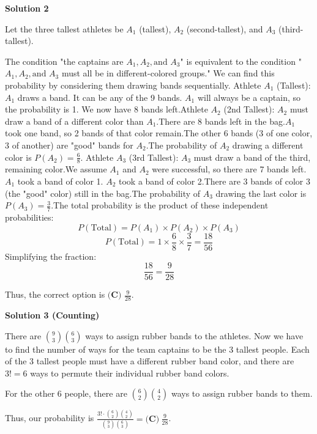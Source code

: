 \begin{enumerate}
\textbf{Solution 2}

Let the three tallest athletes be $A_1$ (tallest), $A_2$ (second-tallest), and $A_3$ (third-tallest).

 The condition "the captains are $A_1, A_2, \text{and } A_3$" is equivalent to the condition "$A_1, A_2, \text{and } A_3$ must all be in different-colored groups." We can find this probability by considering them drawing bands sequentially. Athlete $A_1$ (Tallest): $A_1$ draws a band. It can be any of the 9 bands. $A_1$ will always be a captain, so the probability is 1. We now have 8 bands left.Athlete $A_2$ (2nd Tallest): $A_2$ must draw a band of a different color than $A_1$.There are 8 bands left in the bag.$A_1$ took one band, so 2 bands of that color remain.The other 6 bands (3 of one color, 3 of another) are "good" bands for $A_2$.The probability of $A_2$ drawing a different color is $P(A_2) = \frac{6}{8}$. Athlete $A_3$ (3rd Tallest): $A_3$ must draw a band of the third, remaining color.We assume $A_1$ and $A_2$ were successful, so there are 7 bands left.$A_1$ took a band of color 1. $A_2$ took a band of color 2.There are 3 bands of color 3 (the "good" color) still in the bag.The probability of $A_3$ drawing the last color is $P(A_3) = \frac{3}{7}$.The total probability is the product of these independent probabilities:
 \[P(\text{Total}) = P(A_1) \times P(A_2) \times P(A_3)\]
 \[P(\text{Total}) = 1 \times \frac{6}{8} \times \frac{3}{7} = \frac{18}{56}\]Simplifying the fraction:
 \[\frac{18}{56} = \frac{9}{28}\]

 Thus, the correct option is $\boxed{\textbf{(C) }\frac{9}{28}}.$




\textbf{Solution 3 (Counting)}

There are $\binom{9}{3}\binom{6}{3}$ ways to assign rubber bands to the athletes. Now we have to find the number of ways for the team captains to be the 3 tallest people. Each of the 3 tallest people must have a different rubber band color, and there are $3! = 6$ ways to permute their individual rubber band colors.

 For the other 6 people, there are $\binom{6}{2}\binom{4}{2}$ ways to assign rubber bands to them. 

 Thus, our probability is $\frac{3! \cdot \binom{6}{2}\binom{4}{2}}{\binom{9}{3}\binom{6}{3}} = \boxed{\textbf{(C)}\hspace{3pt}\frac{9}{28}}$.

 




\end{enumerate}
